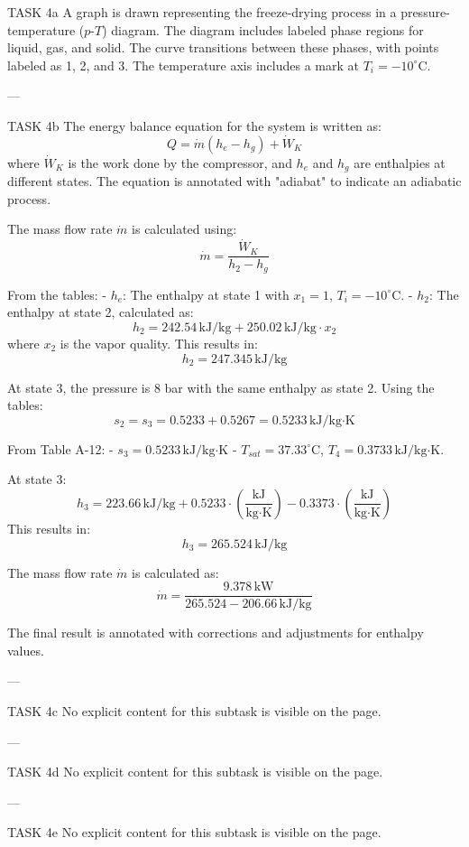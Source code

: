 TASK 4a  
A graph is drawn representing the freeze-drying process in a pressure-temperature (\(p\)-\(T\)) diagram. The diagram includes labeled phase regions for liquid, gas, and solid. The curve transitions between these phases, with points labeled as 1, 2, and 3. The temperature axis includes a mark at \(T_i = -10^\circ\text{C}\).

---

TASK 4b  
The energy balance equation for the system is written as:  
\[
Q = \dot{m} \left( h_e - h_g \right) + \dot{W}_K
\]  
where \( \dot{W}_K \) is the work done by the compressor, and \( h_e \) and \( h_g \) are enthalpies at different states. The equation is annotated with "adiabat" to indicate an adiabatic process.

The mass flow rate \( \dot{m} \) is calculated using:  
\[
\dot{m} = \frac{\dot{W}_K}{h_2 - h_g}
\]  

From the tables:  
- \( h_e \): The enthalpy at state 1 with \( x_1 = 1 \), \( T_i = -10^\circ\text{C} \).  
- \( h_2 \): The enthalpy at state 2, calculated as:  
\[
h_2 = 242.54 \, \text{kJ/kg} + 250.02 \, \text{kJ/kg} \cdot x_2
\]  
where \( x_2 \) is the vapor quality. This results in:  
\[
h_2 = 247.345 \, \text{kJ/kg}
\]  

At state 3, the pressure is 8 bar with the same enthalpy as state 2. Using the tables:  
\[
s_2 = s_3 = 0.5233 + 0.5267 = 0.5233 \, \text{kJ/kg·K}
\]  

From Table A-12:  
- \( s_3 = 0.5233 \, \text{kJ/kg·K} \)  
- \( T_{sat} = 37.33^\circ\text{C} \), \( T_4 = 0.3733 \, \text{kJ/kg·K} \).  

At state 3:  
\[
h_3 = 223.66 \, \text{kJ/kg} + 0.5233 \cdot \left( \frac{\text{kJ}}{\text{kg·K}} \right) - 0.3373 \cdot \left( \frac{\text{kJ}}{\text{kg·K}} \right)
\]  
This results in:  
\[
h_3 = 265.524 \, \text{kJ/kg}
\]  

The mass flow rate \( \dot{m} \) is calculated as:  
\[
\dot{m} = \frac{9.378 \, \text{kW}}{265.524 - 206.66 \, \text{kJ/kg}}
\]  

The final result is annotated with corrections and adjustments for enthalpy values.

---

TASK 4c  
No explicit content for this subtask is visible on the page.  

---

TASK 4d  
No explicit content for this subtask is visible on the page.  

---

TASK 4e  
No explicit content for this subtask is visible on the page.  